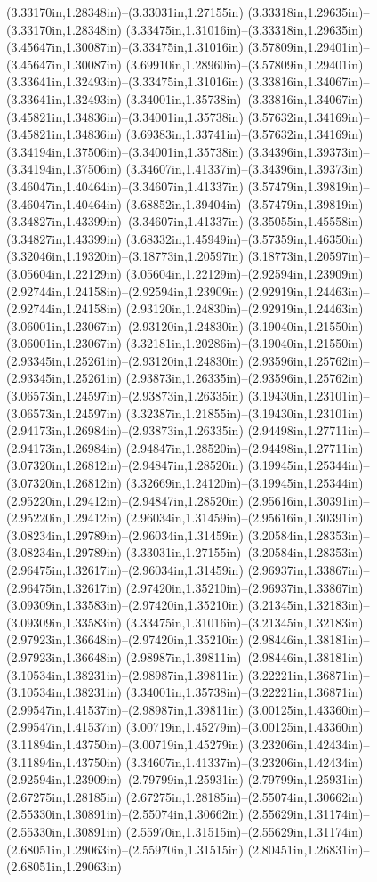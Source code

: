 (3.33170in,1.28348in)--(3.33031in,1.27155in) (3.33318in,1.29635in)--(3.33170in,1.28348in) (3.33475in,1.31016in)--(3.33318in,1.29635in) (3.45647in,1.30087in)--(3.33475in,1.31016in) (3.57809in,1.29401in)--(3.45647in,1.30087in) (3.69910in,1.28960in)--(3.57809in,1.29401in) (3.33641in,1.32493in)--(3.33475in,1.31016in) (3.33816in,1.34067in)--(3.33641in,1.32493in) (3.34001in,1.35738in)--(3.33816in,1.34067in) (3.45821in,1.34836in)--(3.34001in,1.35738in) (3.57632in,1.34169in)--(3.45821in,1.34836in) (3.69383in,1.33741in)--(3.57632in,1.34169in) (3.34194in,1.37506in)--(3.34001in,1.35738in) (3.34396in,1.39373in)--(3.34194in,1.37506in) (3.34607in,1.41337in)--(3.34396in,1.39373in) (3.46047in,1.40464in)--(3.34607in,1.41337in) (3.57479in,1.39819in)--(3.46047in,1.40464in) (3.68852in,1.39404in)--(3.57479in,1.39819in) (3.34827in,1.43399in)--(3.34607in,1.41337in) (3.35055in,1.45558in)--(3.34827in,1.43399in) (3.68332in,1.45949in)--(3.57359in,1.46350in) (3.32046in,1.19320in)--(3.18773in,1.20597in) (3.18773in,1.20597in)--(3.05604in,1.22129in) (3.05604in,1.22129in)--(2.92594in,1.23909in) (2.92744in,1.24158in)--(2.92594in,1.23909in) (2.92919in,1.24463in)--(2.92744in,1.24158in) (2.93120in,1.24830in)--(2.92919in,1.24463in) (3.06001in,1.23067in)--(2.93120in,1.24830in) (3.19040in,1.21550in)--(3.06001in,1.23067in) (3.32181in,1.20286in)--(3.19040in,1.21550in) (2.93345in,1.25261in)--(2.93120in,1.24830in) (2.93596in,1.25762in)--(2.93345in,1.25261in) (2.93873in,1.26335in)--(2.93596in,1.25762in) (3.06573in,1.24597in)--(2.93873in,1.26335in) (3.19430in,1.23101in)--(3.06573in,1.24597in) (3.32387in,1.21855in)--(3.19430in,1.23101in) (2.94173in,1.26984in)--(2.93873in,1.26335in) (2.94498in,1.27711in)--(2.94173in,1.26984in) (2.94847in,1.28520in)--(2.94498in,1.27711in) (3.07320in,1.26812in)--(2.94847in,1.28520in) (3.19945in,1.25344in)--(3.07320in,1.26812in) (3.32669in,1.24120in)--(3.19945in,1.25344in) (2.95220in,1.29412in)--(2.94847in,1.28520in) (2.95616in,1.30391in)--(2.95220in,1.29412in) (2.96034in,1.31459in)--(2.95616in,1.30391in) (3.08234in,1.29789in)--(2.96034in,1.31459in) (3.20584in,1.28353in)--(3.08234in,1.29789in) (3.33031in,1.27155in)--(3.20584in,1.28353in) (2.96475in,1.32617in)--(2.96034in,1.31459in) (2.96937in,1.33867in)--(2.96475in,1.32617in) (2.97420in,1.35210in)--(2.96937in,1.33867in) (3.09309in,1.33583in)--(2.97420in,1.35210in) (3.21345in,1.32183in)--(3.09309in,1.33583in) (3.33475in,1.31016in)--(3.21345in,1.32183in) (2.97923in,1.36648in)--(2.97420in,1.35210in) (2.98446in,1.38181in)--(2.97923in,1.36648in) (2.98987in,1.39811in)--(2.98446in,1.38181in) (3.10534in,1.38231in)--(2.98987in,1.39811in) (3.22221in,1.36871in)--(3.10534in,1.38231in) (3.34001in,1.35738in)--(3.22221in,1.36871in) (2.99547in,1.41537in)--(2.98987in,1.39811in) (3.00125in,1.43360in)--(2.99547in,1.41537in) (3.00719in,1.45279in)--(3.00125in,1.43360in) (3.11894in,1.43750in)--(3.00719in,1.45279in) (3.23206in,1.42434in)--(3.11894in,1.43750in) (3.34607in,1.41337in)--(3.23206in,1.42434in) (2.92594in,1.23909in)--(2.79799in,1.25931in) (2.79799in,1.25931in)--(2.67275in,1.28185in) (2.67275in,1.28185in)--(2.55074in,1.30662in) (2.55330in,1.30891in)--(2.55074in,1.30662in) (2.55629in,1.31174in)--(2.55330in,1.30891in) (2.55970in,1.31515in)--(2.55629in,1.31174in) (2.68051in,1.29063in)--(2.55970in,1.31515in) (2.80451in,1.26831in)--(2.68051in,1.29063in) 